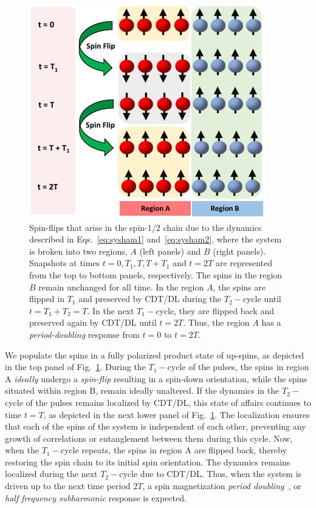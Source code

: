 \documentclass[12pt]{iopart}
\begin{document}
\begin{figure}[t!]
    \centering
    \includegraphics[width=7.cm]{pic_regions.pdf}
    \caption{Spin-flips that arise in the spin-$1/2$ chain due to the dynamics described in Eqs.~\ref{eq:sysham1} and~\ref{eq:sysham2}, where the system is broken into two regions, $A$ (left panels) and $B$ (right panels). Snapshots at times $t=0, T_1, T, T+T_1 $ and $t=2T$ are represented from the top to bottom panels, respectively. The spins in the region $B$ remain unchanged for all time. In the region $A$, the spins are flipped in $T_1$ and preserved by CDT/DL during the $T_2-$cycle until $t=T_1+T_2=T$. In the next $T_1-$cycle, they are flipped back and preserved again by CDT/DL until $t=2T$. Thus, the region $A$ has a \textit{period-doubling} response from $t=0$ to $t=2T$.}
    \label{Fig:spinflip}
\end{figure}
	
	We populate the spins in a fully polarized product state of up-spins, as depicted in the top panel of Fig.~\ref{Fig:spinflip}. During the $T_1-$cycle of the pulses,  the spins in region A \textit{ideally} undergo a \textit{spin-flip} resulting in a spin-down orientation, while the spins situated within region B, remain ideally unaltered. If the dynamics in the $T_2-$cycle of the pulses remains localized by CDT/DL, this state of affairs continues to time $t=T$, as depicted in the next lower panel of Fig.~\ref{Fig:spinflip}. The localization ensures that each of the spins of the system is independent of each other, preventing any growth of correlations or entanglement between them during this cycle. Now, when the $T_1-$cycle repeats, the spins in region A are flipped back, thereby restoring the spin chain to its initial spin orientation. The dynamics remains localized during the next $T_2-$cycle due to CDT/DL. Thus, when the system is driven up to the next time period $2T$, a spin magnetization \textit{period doubling}~\cite{rovny_31mathrmp_2018, Pan2020}, or \textit{ half frequency subharmonic} response is expected. 
	
\end{document}
